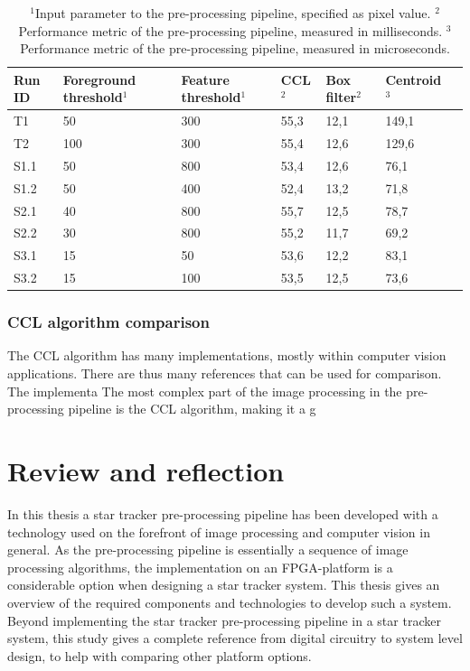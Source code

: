 \documentclass[12pt]{report}
\begin{document}
\begin{table}[!h]
    \centering
    \begin{tabular}{|p{0.8cm}|p{2.5cm}|p{2cm}||p{1.25cm}|p{1.25cm}|p{1.9cm}|p{1cm}|}
        \hline
        \textbf{Run ID}&\textbf{Foreground threshold$^{1}$}&\textbf{Feature threshold$^{1}$}&\textbf{CCL$^{2}$}&\textbf{Box filter$^{2}$}&\textbf{Centroid$^{3}$}\\
        \hline
        T1&50&300&55,3&12,1&149,1\\
        \hline
        T2&100&300&55,4&12,6&129,6\\
        \hline
        S1.1&50&800&53,4&12,6&76,1\\
        \hline
        S1.2&50&400&52,4&13,2&71,8\\
        \hline
        S2.1&40&800&55,7&12,5&78,7\\
        \hline
        S2.2&30&800&55,2&11,7&69,2\\
        \hline
        S3.1&15&50&53,6&12,2&83,1\\
        \hline
        S3.2&15&100&53,5&12,5&73,6\\
        \hline
    \end{tabular}
    \caption{$^{1}$Input parameter to the pre-processing pipeline, specified as pixel value. $^{2}$Performance metric of the pre-processing pipeline, measured in milliseconds. $^{3}$Performance metric of the pre-processing pipeline, measured in microseconds.}
    \label{table:res_sw}
\end{table}

\subsection{CCL algorithm comparison}
The CCL algorithm has many implementations, mostly within computer vision applications. There are thus many references that can be used for comparison.
The implementa
The most complex part of the image processing in the pre-processing pipeline is the CCL algorithm, making it a g


\chapter{Review and reflection}

In this thesis a star tracker pre-processing pipeline has been developed with a technology used on the forefront of image processing and computer vision in general. As the pre-processing pipeline is essentially a sequence of image processing algorithms, the implementation on an FPGA-platform is a considerable option when designing a star tracker system. This thesis gives an overview of the required components and technologies to develop such a system. Beyond implementing the star tracker pre-processing pipeline in a star tracker system, this study gives a complete reference from digital circuitry to system level design, to help with comparing other platform options. 
\par
\end{document}
